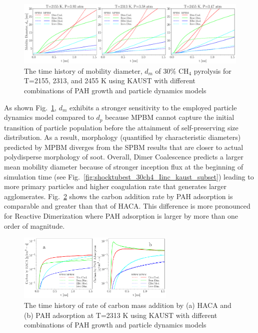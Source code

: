 \begin{figure}[H]
	\centering
	\includegraphics[width=1\textwidth]{Figures/Results/Shocktube/Stanford/june/30CH4_sootdm_kaust_subset.pdf}
	\caption{The time history of mobility diameter, $d_m$ of 30\% $\mathrm{CH_4}$ pyrolysis for T=2155, 2313, and 2455 K using KAUST with different combinations of PAH growth and particle dynamics models}
	\label{fig:shocktubest_30ch4_dm_kaust_subset} 
\end{figure}

As shown Fig.~\ref{fig:shocktubest_30ch4_dm_kaust_subset},  $d_m$ exhibits a stronger sensitivity to the employed particle dynamics model compared to $d_p$ because MPBM cannot capture the initial transition of particle population before the attainment of self-preserving size distribution. As a result, morphology (quantified by characteristic diameters) predicted by MPBM diverges from the SPBM results that are closer to actual polydisperse morphology of soot. Overall, Dimer Coalescence predicts a larger mean mobility diameter because of stronger inception flux at the beginning of simulation time (see Fig.~\ref{fig:shocktubest_30ch4_Iinc_kaust_subset}) leading to more primary particles and higher coagulation rate that generates larger agglomerates. Fig.~\ref{fig:shocktubest_30ch4_Ctot_kaust_single} shows the carbon addition rate by PAH adsorption is comparable and greater than that of HACA. This difference is more pronounced for Reactive Dimerization where PAH adsorption is larger by more than one order of magnitude. 

\begin{figure}[H]
	\centering
	\includegraphics[width=0.67\textwidth]{Figures/Results/Shocktube/Stanford/june/30CH4_sootCtot_kaust_single.pdf}
	\caption{The time history of rate of carbon mass addition by (a) HACA and (b) PAH adsorption at T=2313 K using KAUST with different combinations of PAH growth and particle dynamics models}
	\label{fig:shocktubest_30ch4_Ctot_kaust_single} 
\end{figure}



